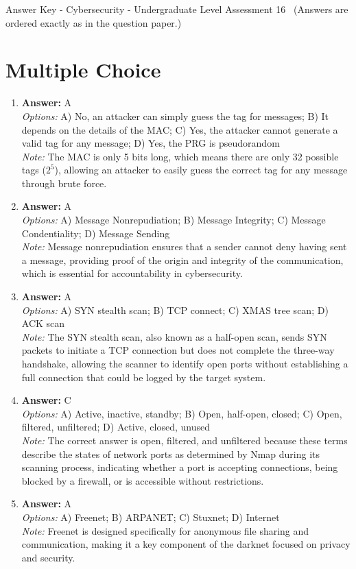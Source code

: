\documentclass[12pt]{article}
\begin{document}
\begin{center}
Answer Key - Cybersecurity - Undergraduate Level Assessment 16 \
\small (Answers are ordered exactly as in the question paper.)
\end{center}

\section*{Multiple Choice}
\begin{enumerate}[label=\arabic*.]
\item \textbf{Answer:} A
\\ \textit{Options:} A) No, an attacker can simply guess the tag for messages; B) It depends on the details of the MAC; C) Yes, the attacker cannot generate a valid tag for any message; D) Yes, the PRG is pseudorandom
\\ \textit{Note:} The MAC is only 5 bits long, which means there are only 32 possible tags ($2^5$), allowing an attacker to easily guess the correct tag for any message through brute force.
\item \textbf{Answer:} A
\\ \textit{Options:} A) Message Nonrepudiation; B) Message Integrity; C) Message Condentiality; D) Message Sending
\\ \textit{Note:} Message nonrepudiation ensures that a sender cannot deny having sent a message, providing proof of the origin and integrity of the communication, which is essential for accountability in cybersecurity.
\item \textbf{Answer:} A
\\ \textit{Options:} A) SYN stealth scan; B) TCP connect; C) XMAS tree scan; D) ACK scan
\\ \textit{Note:} The SYN stealth scan, also known as a half-open scan, sends SYN packets to initiate a TCP connection but does not complete the three-way handshake, allowing the scanner to identify open ports without establishing a full connection that could be logged by the target system.
\item \textbf{Answer:} C
\\ \textit{Options:} A) Active, inactive, standby; B) Open, half-open, closed; C) Open, filtered, unfiltered; D) Active, closed, unused
\\ \textit{Note:} The correct answer is open, filtered, and unfiltered because these terms describe the states of network ports as determined by Nmap during its scanning process, indicating whether a port is accepting connections, being blocked by a firewall, or is accessible without restrictions.
\item \textbf{Answer:} A
\\ \textit{Options:} A) Freenet; B) ARPANET; C) Stuxnet; D) Internet
\\ \textit{Note:} Freenet is designed specifically for anonymous file sharing and communication, making it a key component of the darknet focused on privacy and security.
\end{enumerate}
\end{document}
